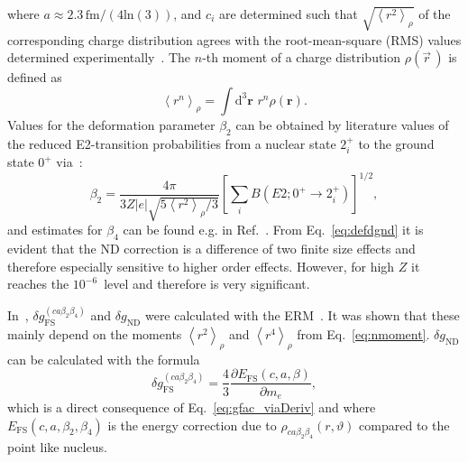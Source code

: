 where $a\approx 2.3\,\text{fm}/(4\text{ln}(3))$, and $c_i$ are determined such that $\sqrt{\left<r^2\right>_{\rho}}$ of the corresponding charge distribution agrees with the root-mean-square (RMS) values determined experimentally~\cite{Angeli2013}. The $n$-th moment of a charge distribution $\rho(\vec{r}\,)$ is defined as
\begin{equation}
\left< r^n \right>_{\rho} = \int \text{d}^3\mathbf{r}\,\, r^n \rho(\mathbf{r}).
\label{eq:nmoment}
\end{equation}
Values for the deformation parameter $\beta_2$ can be obtained by literature values of the reduced E2-transition probabilities from a nuclear state $2^+_i$ to the ground state $0^+$ via~\cite{Trager}:
\begin{equation}
\beta_2 = \frac{4\pi}{3Z|e|\sqrt{5\left< r^2\right>_{\rho} /3}}\left[ \sum_i B(E2;0^+\rightarrow 2_i^+) \right]^{1/2},
\label{eq:beta}
\end{equation}
and estimates for $\beta_4$ can be found e.g. in Ref.~\cite{Moller1995}.
From Eq.~\eqref{eq:defdgnd} it is evident that the ND correction is a difference of two finite size effects and therefore especially sensitive to higher order effects. However, for high $Z$ it reaches the $10^{-6}$~level and therefore is very significant.

In~\cite{jacek2012}, $\delta g_{\text{FS}}^{(ca\beta_2\beta_4)}$ and $\delta g_{\text{ND}}$ were calculated with the ERM~\cite{Shabaev1993}. It was shown that these mainly depend on the moments $\left< r^2 \right>_{\rho}$ and $\left< r^4 \right>_{\rho}$ from Eq.~\eqref{eq:nmoment}.
$\delta g_{\text{ND}}$ can be calculated with the formula~\cite{Karshenboim2005}
\begin{equation}
\delta g^{(ca\beta_2\beta_4)}_{\text{FS}}=\frac{4}{3}\frac{\partial E_{\text{FS}}(c,a,\beta)}{\partial m_e},
\label{eq:effrad}
\end{equation}
which is a direct consequence of Eq.~\eqref{eq:gfac_viaDeriv} and where $E_{\text{FS}}(c,a,\beta_2,\beta_4)$ is the energy correction due to $\rho_{ca\beta_2\beta_4}(r,\vartheta)$ compared to the point like nucleus.

